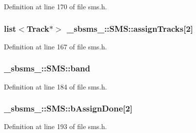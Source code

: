 Definition at line 170 of file sms.\+h.

\subsubsection[{\texorpdfstring{assign\+Tracks}{assignTracks}}]{\setlength{\rightskip}{0pt plus 5cm}list$<${\bf Track}$\ast$$>$ \+\_\+sbsms\+\_\+\+::\+S\+M\+S\+::assign\+Tracks\mbox{[}2\mbox{]}\hspace{0.3cm}{\ttfamily [protected]}}\hypertarget{class__sbsms___1_1_s_m_s_af6ac437207069de23cb5b2d999574a13}{}\label{class__sbsms___1_1_s_m_s_af6ac437207069de23cb5b2d999574a13}


Definition at line 167 of file sms.\+h.

\subsubsection[{\texorpdfstring{band}{band}}]{ \+\_\+sbsms\+\_\+\+::\+S\+M\+S\+::band\hspace{0.3cm}{\ttfamily [protected]}}\hypertarget{class__sbsms___1_1_s_m_s_a88a9ac9f81a519c8d2b07b70ca33eb0c}{}\label{class__sbsms___1_1_s_m_s_a88a9ac9f81a519c8d2b07b70ca33eb0c}


Definition at line 184 of file sms.\+h.

\subsubsection[{\texorpdfstring{b\+Assign\+Done}{bAssignDone}}]{ \+\_\+sbsms\+\_\+\+::\+S\+M\+S\+::b\+Assign\+Done\mbox{[}2\mbox{]}\hspace{0.3cm}{\ttfamily [protected]}}\hypertarget{class__sbsms___1_1_s_m_s_a27fdb32d0b467ea306632172ce5de414}{}\label{class__sbsms___1_1_s_m_s_a27fdb32d0b467ea306632172ce5de414}


Definition at line 193 of file sms.\+h.

